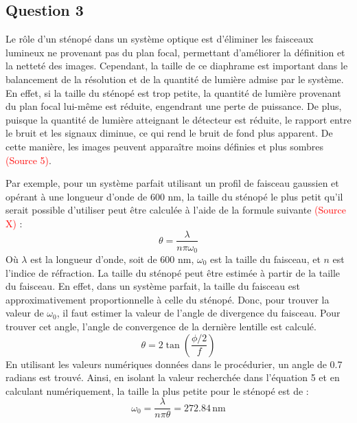 \documentclass[11pt,letterpaper]{article}
\begin{document}


\subsection{Question 3}
Le rôle d'un sténopé dans un système optique est d'éliminer les faisceaux lumineux ne provenant pas du plan focal, permettant d'améliorer la définition et la netteté des images. Cependant, la taille de ce diaphrame est important dans le balancement de la résolution et de la quantité de lumière admise par le système. En effet, si la taille du sténopé est trop petite, la quantité de lumière provenant du plan focal lui-même est réduite, engendrant une perte de puissance. De plus, puisque la quantité de lumière atteignant le détecteur est réduite, le rapport entre le bruit et les signaux diminue, ce qui rend le bruit de fond plus apparent. De cette manière, les images peuvent apparaître moins définies et plus sombres \textcolor{red}{(Source 5)}. 

Par exemple, pour un système parfait utilisant un profil de faisceau gaussien et opérant à une longueur d'onde de 600 nm, la taille du sténopé le plus petit qu'il serait possible d'utiliser peut être calculée à l'aide de la formule suivante \textcolor{red}{(Source X)} :
\begin{equation}
  \theta=\frac{\lambda}{n\pi\omega_{0}}
\end{equation}
Où $\lambda$ est la longueur d'onde, soit de 600 nm, $\omega_{0}$ est la taille du faisceau, et $n$ est l'indice de réfraction. La taille du sténopé peut être estimée à partir de la taille du faisceau. En effet, dans un système parfait, la taille du faisceau est approximativement proportionnelle à celle du sténopé. Donc, pour trouver la valeur de $\omega_0$, il faut estimer la valeur de l'angle de divergence du faisceau. Pour trouver cet angle, l'angle de convergence de la dernière lentille est calculé.
\begin{equation}
  \theta=2\tan\left(\frac{\phi/2}{f}\right)
\end{equation}
En utilisant les valeurs numériques données dans le procédurier, un angle de 0.7 radians est trouvé. Ainsi, en isolant la valeur recherchée dans l'équation 5 et en calculant numériquement, la taille la plus petite pour le sténopé est de :
\begin{equation}
  \omega_{0}=\frac{\lambda}{n\pi\theta}=272.84\,\mathrm{nm}
\end{equation}
\end{document}
